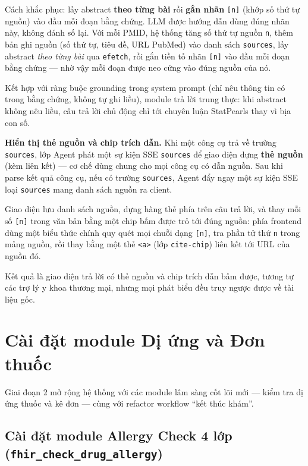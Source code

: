 \documentclass[a4paper,13pt,3p,twoside,openany]{report}
\theoremstyle{definition}
\theoremstyle{remark}
\theoremstyle{definition}
\let\ORIGsection\section
\let\ORIGsubsection\subsection
\renewcommand{\section}{\needspace{3\baselineskip}\ORIGsection}
\renewcommand{\subsection}{\needspace{3\baselineskip}\ORIGsubsection}
\begin{document}
Cách khắc phục: lấy abstract \textbf{theo từng bài} rồi \textbf{gắn nhãn} \texttt{[n]} (khớp số thứ tự nguồn) vào đầu mỗi đoạn bằng chứng. LLM được hướng dẫn dùng đúng nhãn này, không đánh số lại. Với mỗi PMID, hệ thống tăng số thứ tự nguồn \texttt{n}, thêm bản ghi nguồn (số thứ tự, tiêu đề, URL PubMed) vào danh sách \texttt{sources}, lấy abstract \textit{theo từng bài} qua \texttt{efetch}, rồi gắn tiền tố nhãn \texttt{[n]} vào đầu mỗi đoạn bằng chứng --- nhờ vậy mỗi đoạn được neo cứng vào đúng nguồn của nó.

Kết hợp với ràng buộc grounding trong system prompt (chỉ nêu thông tin có trong bằng chứng, không tự ghi liều), module trả lời trung thực: khi abstract không nêu liều, câu trả lời chủ động chỉ tới chuyên luận StatPearls thay vì bịa con số.

\textbf{Hiển thị thẻ nguồn và chip trích dẫn.} Khi một công cụ trả về trường \texttt{sources}, lớp Agent phát một sự kiện SSE \texttt{sources} để giao diện dựng \textbf{thẻ nguồn} (kèm liên kết) --- cơ chế dùng chung cho mọi công cụ có dẫn nguồn. Sau khi parse kết quả công cụ, nếu có trường \texttt{sources}, Agent đẩy ngay một sự kiện SSE loại \texttt{sources} mang danh sách nguồn ra client.

Giao diện lưu danh sách nguồn, dựng hàng thẻ phía trên câu trả lời, và thay mỗi số \texttt{[n]} trong văn bản bằng một chip bấm được trỏ tới đúng nguồn: phía frontend dùng một biểu thức chính quy quét mọi chuỗi dạng \texttt{[n]}, tra phần tử thứ \texttt{n} trong mảng nguồn, rồi thay bằng một thẻ \texttt{<a>} (lớp \texttt{cite-chip}) liên kết tới URL của nguồn đó.

Kết quả là giao diện trả lời có thẻ nguồn và chip trích dẫn bấm được, tương tự các trợ lý y khoa thương mại, nhưng mọi phát biểu đều truy ngược được về tài liệu gốc.

\section{Cài đặt module Dị ứng và Đơn thuốc}

Giai đoạn 2 mở rộng hệ thống với các module lâm sàng cốt lõi mới --- kiểm tra dị ứng thuốc và kê đơn --- cùng với refactor workflow ``kết thúc khám''.

\subsection{Cài đặt module Allergy Check 4 lớp (\texttt{fhir\_check\_drug\_allergy})}
\end{document}
